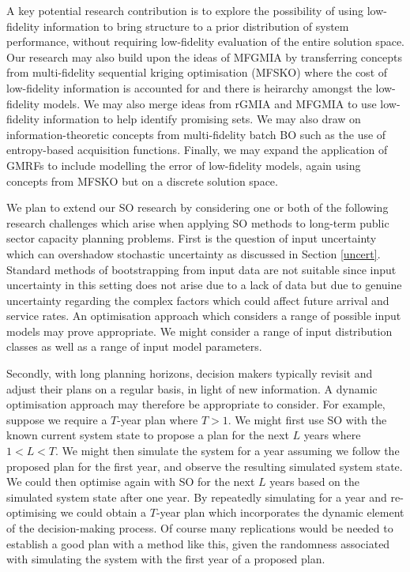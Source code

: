 \documentclass[12pt,a4paper]{article}
\begin{document}
A key potential research contribution is to explore the possibility of using low-fidelity information to bring structure to a prior distribution of system performance, without requiring low-fidelity evaluation of the entire solution space. Our research may also build upon the ideas of MFGMIA by transferring concepts from multi-fidelity sequential kriging optimisation (MFSKO) \citep{huang2006sequential} where the cost of low-fidelity information is accounted for and there is heirarchy amongst the low-fidelity models. We may also merge ideas from rGMIA and MFGMIA to use low-fidelity information to help identify promising sets. We may also draw on information-theoretic concepts from multi-fidelity batch BO such as the use of entropy-based acquisition functions. Finally, we may expand the application of GMRFs to include modelling the error of low-fidelity models, again using concepts from MFSKO but on a discrete solution space.

We plan to extend our SO research by considering one or both of the following research challenges which arise when applying SO methods to long-term public sector capacity planning problems. First is the question of input uncertainty which can overshadow stochastic uncertainty as discussed in Section \ref{uncert}. Standard methods of bootstrapping from input data are not suitable since input uncertainty in this setting does not arise due to a lack of data but due to genuine uncertainty regarding the complex factors which could affect future arrival and service rates. An optimisation approach which considers a range of possible input models may prove appropriate. We might consider a range of input distribution classes as well as a range of input model parameters.

Secondly, with long planning horizons, decision makers typically revisit and adjust their plans on a regular basis, in light of new information. A dynamic optimisation approach may therefore be appropriate to consider. For example, suppose we require a $T$-year plan where $T>1$. We might first use SO with the known current system state to propose a plan for the next $L$ years where $1<L<T$. We might then simulate the system for a year assuming we follow the proposed plan for the first year, and observe the resulting simulated system state. We could then optimise again with SO for the next $L$ years based on the simulated system state after one year. By repeatedly simulating for a year and re-optimising we could obtain a $T$-year plan which incorporates the dynamic element of the decision-making process. Of course many replications would be needed to establish a good plan with a method like this, given the randomness associated with simulating the system with the first year of a proposed plan.

\newpage



\end{document}
